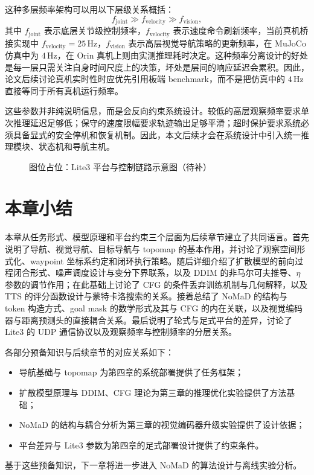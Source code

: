 这种多层频率架构可以用以下层级关系概括：
\begin{equation}
f_{\text{joint}} \gg f_{\text{velocity}} \gg f_{\text{vision}},
\end{equation}
其中 $f_{\text{joint}}$ 表示底层关节级控制频率，$f_{\text{velocity}}$ 表示速度命令刷新频率，当前真机桥接实现中 $f_{\text{velocity}}=25\,\text{Hz}$，$f_{\text{vision}}$ 表示高层视觉导航策略的更新频率，在 MuJoCo 仿真中为 $4\,\text{Hz}$，在 Orin 真机上则由实测推理耗时决定。这种频率分离设计的好处是每一层只需关注自身时间尺度上的决策，坏处是层间的响应延迟会累积。因此，论文后续讨论真机实时性时应优先引用板端 benchmark，而不是把仿真中的 $4\,\text{Hz}$ 直接等同于所有真机运行频率。

这些参数并非纯说明信息，而是会反向约束系统设计。较低的高层观察频率要求单次推理延迟足够低；保守的速度限幅要求轨迹输出足够平滑；超时保护要求系统必须具备显式的安全停机和恢复机制。因此，本文后续才会在系统设计中引入统一推理模块、状态机和导航主机。

\begin{figure}[htbp]
    \centering
    \fbox{\rule{0pt}{55mm}\rule{0.82\linewidth}{0pt}}
    \caption{图位占位：Lite3 平台与控制链路示意图（待补）}
    \label{fig:prelim-lite3-placeholder}
\end{figure}

\section{本章小结}

本章从任务形式、模型原理和平台约束三个层面为后续章节建立了共同语言。首先说明了导航、视觉导航、目标导航与 topomap 的基本作用，并讨论了观察空间形式化、waypoint 坐标系约定和闭环执行策略。随后详细介绍了扩散模型的前向过程闭合形式、噪声调度设计与变分下界联系，以及 DDIM 的非马尔可夫推导、$\eta$ 参数的调节作用；在此基础上讨论了 CFG 的条件丢弃训练机制与几何解释，以及 TTS 的评分函数设计与蒙特卡洛搜索的关系。接着总结了 NoMaD 的结构与 token 构造方式、goal mask 的数学形式及其与 CFG 的内在关联，以及视觉编码器与距离预测头的直接耦合关系。最后说明了轮式与足式平台的差异，讨论了 Lite3 的 UDP 通信协议以及观察频率与控制频率的分层关系。

各部分预备知识与后续章节的对应关系如下：
\begin{itemize}
    \item 导航基础与 topomap 为第四章的系统部署提供了任务框架；
    \item 扩散模型原理与 DDIM、CFG 理论为第三章的推理优化实验提供了方法基础；
    \item NoMaD 的结构与耦合分析为第三章的视觉编码器升级实验提供了设计依据；
    \item 平台差异与 Lite3 参数为第四章的足式部署设计提供了约束条件。
\end{itemize}
基于这些预备知识，下一章将进一步进入 NoMaD 的算法设计与离线实验分析。
